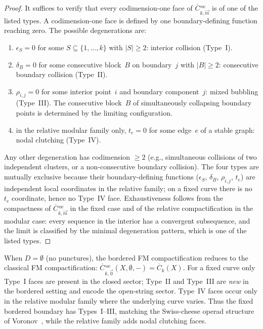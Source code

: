 \begin{proof}
It suffices to verify that every codimension-one face of
$\overline{C}{}^{\,\mathrm{oc}}_{k,\vec{m}}$ is of one of the
listed types. A codimension-one face is defined by one
boundary-defining function reaching zero. The possible
degenerations are:
\begin{enumerate}
\item $\epsilon_S = 0$ for some $S \subseteq \{1, \ldots, k\}$
 with $|S| \geq 2$: interior collision (Type~I).
\item $\delta_B = 0$ for some consecutive block~$B$ on
 boundary~$j$ with $|B| \geq 2$: consecutive boundary collision
 (Type~II).
\item $\rho_{i,j} = 0$ for some interior point~$i$ and
 boundary component~$j$: mixed bubbling (Type~III). The
 consecutive block~$B$ of simultaneously collapsing boundary
 points is determined by the limiting configuration.
\item in the relative modular family only, $t_e = 0$ for some edge~$e$
of a stable graph: nodal clutching (Type~IV).
\end{enumerate}
Any other degeneration has codimension $\geq 2$ (e.g.,
simultaneous collisions of two independent clusters, or a
non-consecutive boundary collision). The four types are
mutually exclusive because their boundary-defining functions
($\epsilon_S$, $\delta_B$, $\rho_{i,j}$, $t_e$) are
independent local coordinates in the relative family; on a fixed curve
there is no $t_e$ coordinate, hence no Type~IV face. Exhaustiveness
follows from the compactness of
$\overline{C}{}^{\,\mathrm{oc}}_{k,\vec{m}}$ in the fixed case and of
the relative compactification in the modular case: every sequence
in the interior has a convergent subsequence, and the limit
is classified by the minimal degeneration pattern, which is
one of the listed types.
\end{proof}

\begin{remark}
\label{rem:comparison-classical-fm}
When $D = \emptyset$ (no punctures), the bordered FM
compactification reduces to the classical FM compactification:
$\overline{C}{}^{\,\mathrm{oc}}_{k,\vec{0}}(X, \emptyset, -)
= \overline{C}_k(X)$.
For a fixed curve only Type~I faces are present in the closed sector;
Type~II and Type~III are \emph{new} in the bordered setting and
encode the open-string sector. Type~IV faces occur only in the
relative modular family where the underlying curve varies. Thus the
fixed bordered boundary has Types~I--III, matching the Swiss-cheese
operad structure of Voronov~\cite{Voronov99}, while the relative
family adds nodal clutching faces.
\end{remark}


